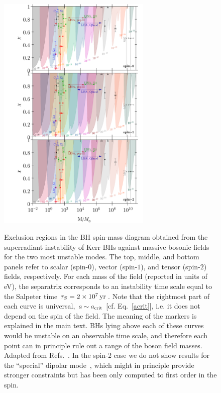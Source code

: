 \documentclass[11pt]{article}
\numberwithin{equation}{section} %
\begin{document}
%
\begin{figure}
\begin{center}
\includegraphics[width=0.65\textwidth]{Regge_spin_total.pdf}\\
\caption{
Exclusion regions in the BH spin-mass diagram obtained from the superradiant 
instability of Kerr BHs against massive bosonic fields for the two most unstable modes.
The top, middle, and bottom panels refer to scalar (spin-$0$), vector (spin-$1$), and tensor (spin-$2$) fields, 
respectively.
%
For each mass of the field (reported in units of eV), the separatrix corresponds to an instability time scale 
equal to the Salpeter time $\tau_S=2\times 10^7 {\rm\, yr\,}$. 
%
Note that the rightmost part of each curve is universal, $a\sim a_{\rm crit}$ [cf. Eq.~\eqref{acrit}], i.e. it does 
not depend on the spin of the field.
%
The meaning of the markers is explained in the main text.
%
BHs lying above each of these curves would be unstable on an observable time scale, and therefore each point can in 
principle rule out a range of the boson field masses. 
%
Adapted from 
Refs.~\cite{Arvanitaki:2014wva,Baryakhtar:2017ngi,Brito:2017zvb,Cardoso:2018tly,Brito:2020lup}.
In the spin-2 case we do not show results for the ``special'' dipolar mode~\cite{Brito:2013wya}, which might in 
principle provide stronger constraints but has been only computed to first order in the spin.
% 
\label{fig:ReggePlane}
}
\end{center}
\end{figure}
%
\end{document}
